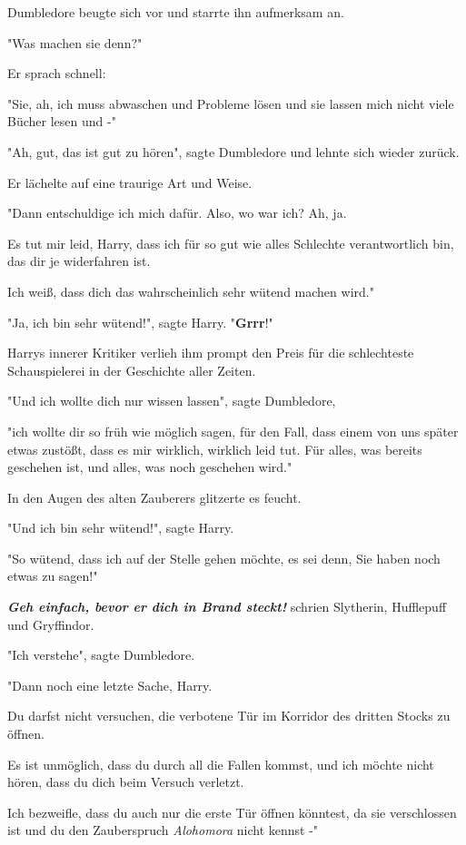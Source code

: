 {Dumbledore beugte sich vor und starrte ihn aufmerksam an.

"Was machen sie denn?"

Er sprach schnell:

"Sie, ah, ich muss abwaschen und Probleme lösen und sie lassen mich nicht viele Bücher lesen und -"

"Ah, gut, das ist gut zu hören", sagte Dumbledore und lehnte sich wieder zurück.

Er lächelte auf eine traurige Art und Weise.

"Dann entschuldige ich mich dafür. Also, wo war ich? Ah, ja.

Es tut mir leid, Harry, dass ich für so gut wie alles Schlechte verantwortlich bin, das dir je widerfahren ist.

Ich weiß, dass dich das wahrscheinlich sehr wütend machen wird."

"Ja, ich bin sehr wütend!", sagte Harry. "\textbf{Grrr}!"

Harrys innerer Kritiker verlieh ihm prompt den Preis für die schlechteste Schauspielerei in der Geschichte aller Zeiten.

"Und ich wollte dich nur wissen lassen", sagte Dumbledore,

"ich wollte dir so früh wie möglich sagen, für den Fall, dass einem von uns später etwas zustößt, dass es mir wirklich, wirklich leid tut. Für alles, was bereits geschehen ist, und alles, was noch geschehen wird."

In den Augen des alten Zauberers glitzerte es feucht.

"Und ich bin sehr wütend!", sagte Harry.

"So wütend, dass ich auf der Stelle gehen möchte, es sei denn, Sie haben noch etwas zu sagen!"

\textbf{\emph{Geh einfach, bevor er dich in Brand steckt!}} schrien Slytherin, Hufflepuff und Gryffindor.

"Ich verstehe", sagte Dumbledore.

"Dann noch eine letzte Sache, Harry.

Du darfst nicht versuchen, die verbotene Tür im Korridor des dritten Stocks zu öffnen.

Es ist unmöglich, dass du durch all die Fallen kommst, und ich möchte nicht hören, dass du dich beim Versuch verletzt.

Ich bezweifle, dass du auch nur die erste Tür öffnen könntest, da sie verschlossen ist und du den Zauberspruch \emph{Alohomora} nicht kennst -"

}
